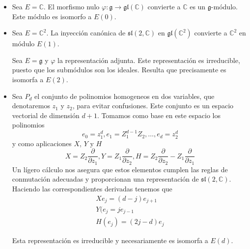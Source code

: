 \documentclass[a4paper,draft,12pt]{scrartcl}
\newcommand{\C}{\mathbb{C}}%
\newcommand{\g}{\mathfrak{g}}%
\begin{document}
\begin{itemize}


\item Sea $E= \C$.  El morfismo nulo $\varphi: \g \rightarrow \mathfrak{gl}(\C)$ convierte a $\C$ es un $\g$-módulo.  Este módulo es isomorfo a $E(0)$.

\item Sea $E= \C^2$.  La inyección canónica de $\mathfrak{sl}(2,\C)$ en $\mathfrak{gl}(\C^2)$ convierte a $\C^2$ en módulo $E(1)$.

Sea $E= \g$ y $\varphi$ la representación  adjunta.  Este representación es irreducible, puesto que los submódulos son los ideales.  Resulta que precisamente es isomorfa a $E(2)$.

\item Sea $P_d$ el conjunto de polinomios homogeneos en dos variables, que denotaremos $z_1$ y $z_2$, para evitar confusiones.  Este conjunto es un espacio vectorial de dimensión $d+1$.  Tomamos como base en este espacio los polinomios
$$
e_0=z_1^d, e_1= Z_1^{d-1}Z_2, \dots , e_d= z_2^d
$$
y como aplicaciones $X$, $Y$ y $H$
$$
X= Z_2 \frac{\partial}{\partial z_1}, Y= Z_1 \frac{\partial}{\partial z_2}, H= Z_2 \frac{\partial}{\partial z_2}- Z_1 \frac{\partial}{\partial z_1}
$$
Un lígero cálculo nos asegura que estos elementos cumplen las reglas de conmutación adecuadas y proporcionan una representación de $\mathfrak{sl}(2, \C)$.  Haciendo las correspondientes derivadas tenemos que
\begin{equation*}
\begin{split}
Xe_j= (d-j)e_{j+1} \\
Y(e_j= j e_{j-1} \\
H(e_j)= (2j-d)e_j
\end{split}
\end{equation*}

Esta representación es irreducible y necesariamente es isomorfa a $E(d)$.





\end{itemize}

\nocite{*}

\newpage






\printindex
\end{document}
